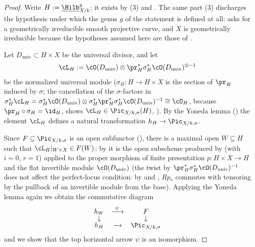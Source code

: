 \begin{proof}
Write $H:=\underline{\Hilb}^g_{X/k}$; it exists by 
(3) and .  The same part (3) discharges the
hypothesis under which the genus $g$ of the statement is defined at all:
 asks for a geometrically irreducible smooth
projective curve, and $X$ is geometrically irreducible because the
hypotheses assumed here are those of .

Let $D_{\mathrm{univ}}\subset H\times X$
be the universal divisor, and let
\[
\cL_H:=\cO(D_{\mathrm{univ}})\otimes
\pr_H^*\sigma_H^*\cO(D_{\mathrm{univ}})^{\otimes-1}
\]
be the normalized universal module ($\sigma_H:H\to H\times X$ is the
section of $\pr_H$ induced by $\sigma$; the cancellation of the
$\sigma$-factors in
$\sigma_H^*\cL_H=\sigma_H^*\cO(D_{\mathrm{univ}})\otimes
\sigma_H^*\pr_H^*\sigma_H^*\cO(D_{\mathrm{univ}})^{-1}\cong\cO_H$,
because $\pr_H\circ\sigma_H=\id_H$, shows
$\cL_H\in\Pic_{X/k,\sigma}(H)$, ).  By the
Yoneda lemma () the element
$\cL_H$ defines a natural transformation $h_H\to\Pic_{X/k,\sigma}$.

Since $F\subseteq\Pic_{X/k,\sigma}$ is an open subfunctor
(), there is a maximal open $W\subseteq H$
such that $\cL_H|_{W\times X}\in F(W)$; by
 it is the open subscheme produced by
 (with $i=0$, $r=1$) applied to the proper
morphism of finite presentation
$p:H\times X\to H$ and the flat
invertible module
$\cO(D_{\mathrm{univ}})$ (the twist by $\pr_H^*\sigma_H^*\cO(D_{\mathrm{univ}})^{-1}$
does not affect the perfect-locus condition: by
 and ,
$Rp_*$ commutes with tensoring by the pullback of an invertible module
from the base).  Applying the Yoneda lemma again we obtain the commutative
diagram
\[
\begin{array}{ccc}
h_W & \xrightarrow{\ \psi\ } & F\\[-2pt]
\downarrow & & \downarrow\\[-2pt]
h_H & \xrightarrow{\ \ } & \Pic_{X/k,\sigma}
\end{array}
\]
and we show that the top horizontal arrow $\psi$ is an isomorphism.


\end{proof}
